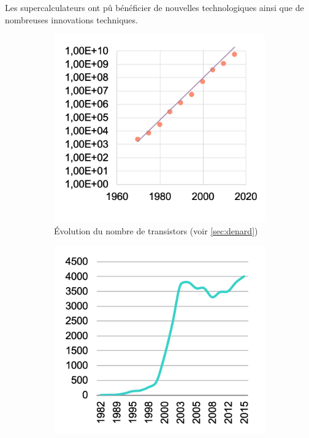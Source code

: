         Les supercalculateurs ont pû bénéficier de nouvelles technologiques ainsi que de nombreuses innovations techniques.
        
        \begin{figure}[t!]
            \centering
            \begin{subfigure}[t]{0.33\textwidth}
                \centering
                \includegraphics[width=\linewidth]{images/evo_transistor.png}
                \caption{\label{fig:evo_transistor}Évolution du nombre de transistors (voir \autoref{sec:denard})}
            \end{subfigure}\hfill
            \begin{subfigure}[t]{0.33\textwidth}
                \centering
                \includegraphics[width=\linewidth]{images/evo_freq.png}

\end{subfigure}
\end{figure}
